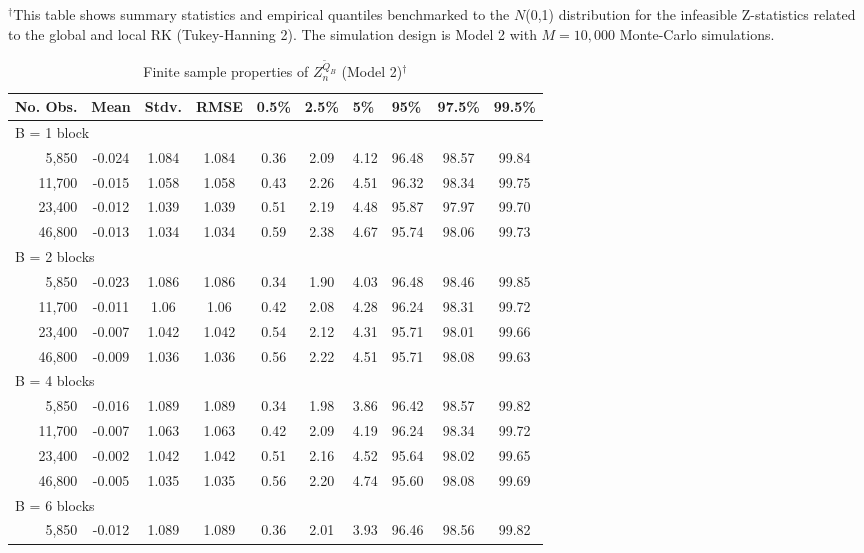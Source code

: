 \documentclass[11pt]{article}
\numberwithin{equation}{section}
\theoremstyle{plain}
\theoremstyle{remark}
\begin{document}
\begin{table}[]
\begin{tabular}{@{}rccccccccc@{}}
\end{tabular}

\scriptsize $^\dag$This table shows summary statistics and empirical quantiles benchmarked to the $N$(0,1) distribution for the infeasible Z-statistics related to the global and local RK (Tukey-Hanning 2). The simulation design is Model 2 with $M = 10,000$ Monte-Carlo simulations. 
\end{table}


\begin{table}[]
\centering
\caption{Finite sample properties of $Z_n^{\tilde{Q}_B}$ (Model 2)$^\dag$}
\label{stdQMLE}
\begin{tabular}{@{}rccccccccc@{}}
\toprule
\toprule
\multicolumn{1}{l}{No. Obs.} & \multicolumn{1}{l}{Mean} & \multicolumn{1}{l}{Stdv.} & \multicolumn{1}{l}{RMSE} & \multicolumn{1}{l}{0.5\%} & \multicolumn{1}{l}{2.5\%} & \multicolumn{1}{l}{5\%} & \multicolumn{1}{l}{95\%} & \multicolumn{1}{l}{97.5\%} & \multicolumn{1}{l}{99.5\%} \\ \toprule
\multicolumn{10}{l}{B = 1 block} \\
5,850 &-0.024&1.084&1.084&0.36&2.09&4.12&96.48&98.57&99.84\\
11,700 & -0.015&1.058&1.058&0.43&2.26&4.51&96.32&98.34&99.75\\
23,400 &  -0.012&1.039&1.039&0.51&2.19&4.48&95.87&97.97&99.70\\
46,800 &  -0.013&1.034&1.034&0.59&2.38&4.67&95.74&98.06&99.73\\
\multicolumn{10}{l}{B = 2 blocks} \\
5,850 & -0.023&1.086&1.086&0.34&1.90&4.03&96.48&98.46&99.85\\
11,700 & -0.011&1.06&1.06&0.42&2.08&4.28&96.24&98.31&99.72\\
23,400 & -0.007&1.042&1.042&0.54&2.12&4.31&95.71&98.01&99.66\\
46,800 & -0.009&1.036&1.036&0.56&2.22&4.51&95.71&98.08&99.63\\
\multicolumn{10}{l}{B = 4 blocks} \\
5,850 & -0.016&1.089&1.089&0.34&1.98&3.86&96.42&98.57&99.82\\
11,700 & -0.007&1.063&1.063&0.42&2.09&4.19&96.24&98.34&99.72\\
23,400 & -0.002&1.042&1.042&0.51&2.16&4.52&95.64&98.02&99.65\\
46,800 &  -0.005&1.035&1.035&0.56&2.20&4.74&95.60&98.08&99.69\\
\multicolumn{10}{l}{B = 6 blocks} \\
5,850 & -0.012&1.089&1.089&0.36&2.01&3.93&96.46&98.56&99.82\\

\end{tabular}
\end{table}
\end{document}

